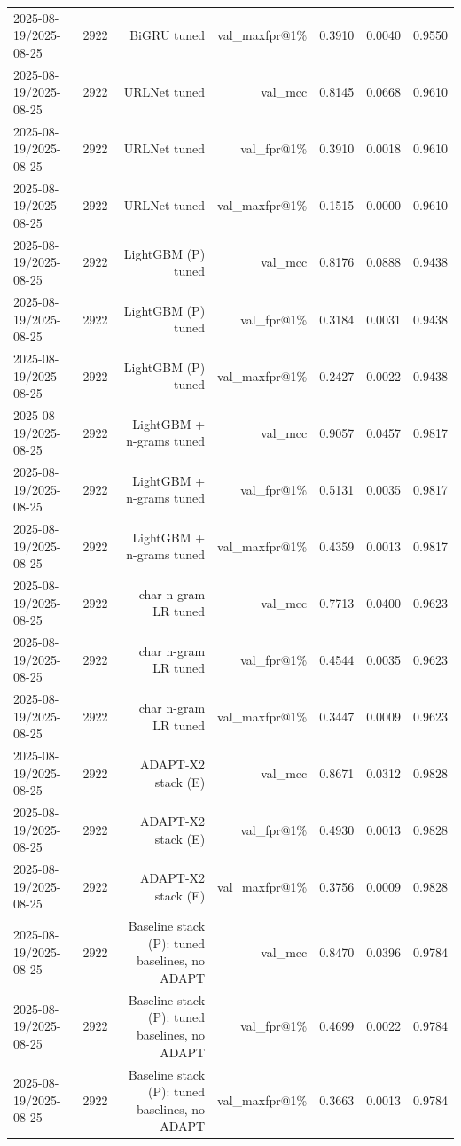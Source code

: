 \begin{table}[t]
\begin{tabular}{llrrrrr}
2025-08-19/2025-08-25 & 2922 & BiGRU tuned & val\_maxfpr@1\% & 0.3910 & 0.0040 & 0.9550 \\
2025-08-19/2025-08-25 & 2922 & URLNet tuned & val\_mcc & 0.8145 & 0.0668 & 0.9610 \\
2025-08-19/2025-08-25 & 2922 & URLNet tuned & val\_fpr@1\% & 0.3910 & 0.0018 & 0.9610 \\
2025-08-19/2025-08-25 & 2922 & URLNet tuned & val\_maxfpr@1\% & 0.1515 & 0.0000 & 0.9610 \\
2025-08-19/2025-08-25 & 2922 & LightGBM (P) tuned & val\_mcc & 0.8176 & 0.0888 & 0.9438 \\
2025-08-19/2025-08-25 & 2922 & LightGBM (P) tuned & val\_fpr@1\% & 0.3184 & 0.0031 & 0.9438 \\
2025-08-19/2025-08-25 & 2922 & LightGBM (P) tuned & val\_maxfpr@1\% & 0.2427 & 0.0022 & 0.9438 \\
2025-08-19/2025-08-25 & 2922 & LightGBM + n-grams tuned & val\_mcc & 0.9057 & 0.0457 & 0.9817 \\
2025-08-19/2025-08-25 & 2922 & LightGBM + n-grams tuned & val\_fpr@1\% & 0.5131 & 0.0035 & 0.9817 \\
2025-08-19/2025-08-25 & 2922 & LightGBM + n-grams tuned & val\_maxfpr@1\% & 0.4359 & 0.0013 & 0.9817 \\
2025-08-19/2025-08-25 & 2922 & char n-gram LR tuned & val\_mcc & 0.7713 & 0.0400 & 0.9623 \\
2025-08-19/2025-08-25 & 2922 & char n-gram LR tuned & val\_fpr@1\% & 0.4544 & 0.0035 & 0.9623 \\
2025-08-19/2025-08-25 & 2922 & char n-gram LR tuned & val\_maxfpr@1\% & 0.3447 & 0.0009 & 0.9623 \\
2025-08-19/2025-08-25 & 2922 & ADAPT-X2 stack (E) & val\_mcc & 0.8671 & 0.0312 & 0.9828 \\
2025-08-19/2025-08-25 & 2922 & ADAPT-X2 stack (E) & val\_fpr@1\% & 0.4930 & 0.0013 & 0.9828 \\
2025-08-19/2025-08-25 & 2922 & ADAPT-X2 stack (E) & val\_maxfpr@1\% & 0.3756 & 0.0009 & 0.9828 \\
2025-08-19/2025-08-25 & 2922 & Baseline stack (P): tuned baselines, no ADAPT & val\_mcc & 0.8470 & 0.0396 & 0.9784 \\
2025-08-19/2025-08-25 & 2922 & Baseline stack (P): tuned baselines, no ADAPT & val\_fpr@1\% & 0.4699 & 0.0022 & 0.9784 \\
2025-08-19/2025-08-25 & 2922 & Baseline stack (P): tuned baselines, no ADAPT & val\_maxfpr@1\% & 0.3663 & 0.0013 & 0.9784 \\

\end{tabular}
\end{table}
